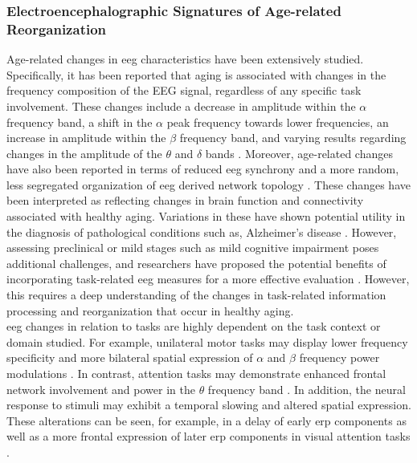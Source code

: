 \subsubsection{Electroencephalographic Signatures of Age-related Reorganization}
Age-related changes in \gls{eeg} characteristics have been extensively studied. Specifically, it has been reported that aging is associated with changes in the frequency composition of the EEG signal, regardless of any specific task involvement. These changes include a decrease in amplitude within the $\alpha$ frequency band, a shift in the $\alpha$ peak frequency towards lower frequencies, an increase in amplitude within the $\beta$ frequency band, and varying results regarding changes in the amplitude of the $\theta$ and $\delta$ bands \cite{ROSSINI2007375, Ishii2017, Courtney2021}. Moreover, age-related changes have also been reported in terms of reduced \gls{eeg} synchrony and a more random, less segregated organization of \gls{eeg} derived network topology \cite{Smit2012, Samogin2022}. These changes have been interpreted as reflecting changes in brain function and connectivity associated with healthy aging. Variations in these have shown potential utility in the diagnosis of pathological conditions such as, Alzheimer's disease \cite{Babiloni_AlzCons2021}. However, assessing preclinical or mild stages such as mild cognitive impairment poses additional challenges, and researchers have proposed the potential benefits of incorporating task-related \gls{eeg} measures for a more effective evaluation \cite{Froehlich2021, Farina2020}. However, this requires a deep understanding of the changes in task-related information processing and reorganization that occur in healthy aging.\\
\Gls{eeg} changes in relation to tasks are highly dependent on the task context or domain studied. For example, unilateral motor tasks may display lower frequency specificity and more bilateral spatial expression of $\alpha$ and $\beta$ frequency power modulations \cite{Quandt2016}. In contrast, attention tasks may demonstrate enhanced frontal network involvement and power in the $\theta$ frequency band \cite{Hong2016}. In addition, the neural response to stimuli may exhibit a temporal slowing and altered spatial expression. These alterations can be seen, for example, in a delay of early \gls{erp} components as well as a more frontal expression of later \gls{erp} components in visual attention tasks \cite{LI2013477, Reuter2017}.\\

